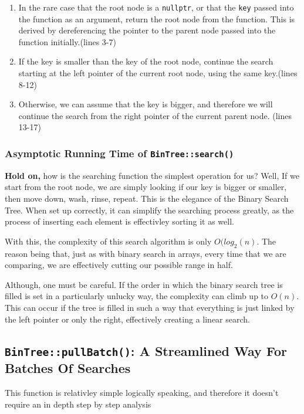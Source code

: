 \documentclass[letterpaper, 10pt]{article}
\begin{document}
\begin{enumerate}
    \item In the rare case that the root node is a \texttt{nullptr}, or that the \texttt{key} passed into the function as an argument, return the root node from the function. This is derived by dereferencing the pointer to the parent node passed into the function initially.(lines 3-7)
    \item If the key is smaller than the key of the root node, continue the search starting at the left pointer of the current root node, using the same key.(lines 8-12)
    \item Otherwise, we can assume that the key is bigger, and therefore we will continue the search from the right pointer of the current parent node. (lines 13-17)
\end{enumerate}

\subsubsection{Asymptotic Running Time of \texttt{BinTree::search()}}
\textbf{Hold on,} how is the searching function the simplest operation for us? Well, If we start from the root node, we are simply looking if our key is bigger or smaller, then move down, wash, rinse, repeat. This is the elegance of the Binary Search Tree. When set up correctly, it can simplify the searching process greatly, as the process of inserting each element is effectivley sorting it as well. 

With this, the complexity of this search algorithm is only $O(log_2(n)$. The reason being that, just as with binary search in arrays, every time that we are comparing, we are effectively cutting our possible range in half. 

Although, one must be careful. If the order in which the binary search tree is filled is set in a particularly unlucky way, the complexity can climb up to $O(n)$. This can occur if the tree is filled in such a way that everything is just linked by the left pointer or only the right, effectively creating a linear search.

\subsection{\texttt{BinTree::pullBatch()}: A Streamlined Way For Batches Of Searches}

This function is relativley simple logically speaking, and therefore it doesn't require an in depth step by step analysis
\end{document}
